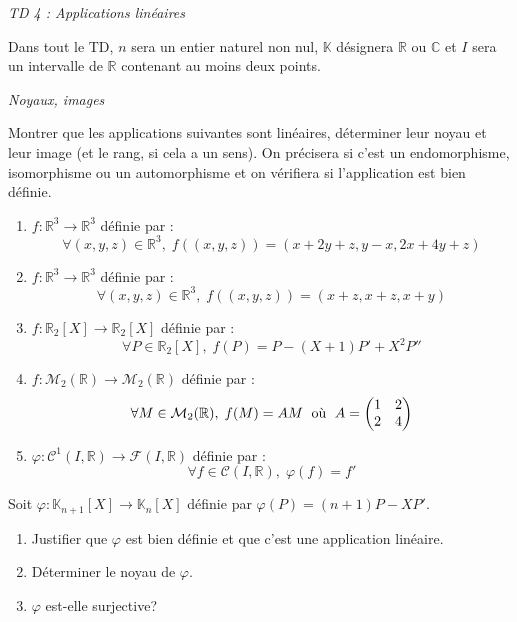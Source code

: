 \documentclass[a4paper,10pt]{report}
\begin{document}
\everymath{\displaystyle}
\begin{center}
\textit{{ {\huge TD 4 : Applications linéaires}}}
\end{center}

\bigskip


\noindent Dans tout le TD, $n$ sera un entier naturel non nul, $\mathbb{K}$ désignera $\mathbb{R}$ ou $\mathbb{C}$ et $I$ sera un intervalle de $\mathbb{R}$ contenant au moins deux points.

\medskip

\begin{center}
\textit{{ {\large Noyaux, images}}}
\end{center}


\begin{Exercice}{} Montrer que les applications suivantes sont linéaires, déterminer leur noyau et leur image (et le rang, si cela a un sens). On précisera si c'est un endomorphisme, isomorphisme ou un automorphisme et on vérifiera si l'application est bien définie.

\begin{enumerate}
\item $f : \mathbb{R}^3 \rightarrow \mathbb{R}^3$ définie par :
$$ \forall (x,y,z) \in \mathbb{R}^3, \; f((x,y,z))= (x+2y+z,y-x,2x+4y+z)$$
\item $f : \mathbb{R}^3 \rightarrow \mathbb{R}^3$ définie par :
$$ \forall (x,y,z) \in \mathbb{R}^3, \; f((x,y,z))= (x+z,x+z,x+y)$$
\item $f : \mathbb{R}_2[X] \rightarrow \mathbb{R}_2[X]$ définie par :
$$ \forall P \in \mathbb{R}_2[X], \; f(P)=P-(X+1)P'+X^2 P''$$
\item $f : \mathcal{M}_2(\mathbb{R}) \rightarrow \mathcal{M}_2(\mathbb{R})$ définie par :
$$ \forall M \in \mathcal{M}_2(\mathbb{R}), \; f(M)=AM \; \hbox{ où } \; A= \begin{pmatrix}
1 & 2 \\
2 & 4 \\
\end{pmatrix} $$
\item $\varphi : \mathcal{C}^1(I, \mathbb{R}) \rightarrow \mathcal{F}(I, \mathbb{R})$ définie par :
$$ \forall f \in \mathcal{C}(I, \mathbb{R}), \; \varphi(f)=f'$$
\end{enumerate}
\end{Exercice}

\begin{Exercice}{} Soit $\varphi : \mathbb{K}_{n+1}[X]\rightarrow \mathbb{K}_{n}[X]$ définie par $\varphi(P) = (n + 1)P - XP'$.
    \begin{enumerate}
      \item
        Justifier que $\varphi$ est bien définie et que c'est une application linéaire.
      \item
        Déterminer le noyau de $\varphi$.
      \item
        $\varphi$ est-elle surjective?
    \end{enumerate}
\end{Exercice}
\end{document}
